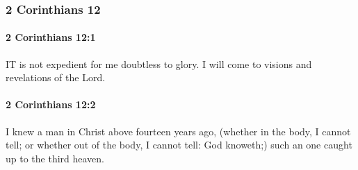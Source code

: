 	\subsubsection{2 Corinthians 12} %
		\label{2CORINTHIANS-12}
		
		\paragraph{2 Corinthians 12:1} %
			\label{2CORINTHIANS-12-1}

			IT is not expedient for me doubtless to glory.  I will come to visions and revelations of the Lord.

			\begin{framed}
			\scriptsize
				\begin{compactdesc}
					\item[SBLG] 
				\end{compactdesc}
			\end{framed}

		\paragraph{2 Corinthians 12:2} %
			\label{2CORINTHIANS-12-2}

			I knew a man in Christ above fourteen years ago, (whether in the body, I cannot tell; or whether out of the body, I cannot tell: God knoweth;) such an one caught up to the third heaven.

